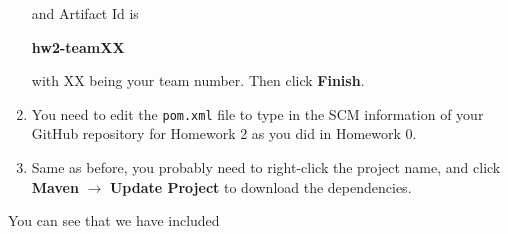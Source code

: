 \begin{enumerate}
and Artifact Id is

\begin{center}
\textbf{hw2-teamXX}
\end{center}

with XX being your team number. Then click \textbf{Finish}.

\item You need to edit the \texttt{pom.xml} file to type in the SCM information
of your GitHub repository for Homework 2 as you did in Homework 0.

\item Same as before, you probably need to right-click the project name, and
click \textbf{Maven} $\rightarrow$ \textbf{Update Project} to download the
dependencies.

\end{enumerate}

You can see that we have included

